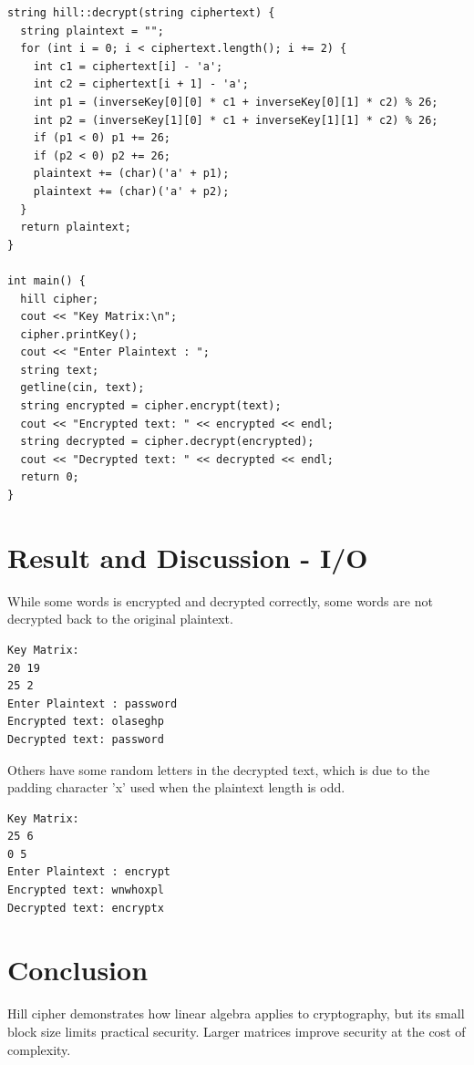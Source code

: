 \begin{verbatim}
string hill::decrypt(string ciphertext) {
  string plaintext = "";
  for (int i = 0; i < ciphertext.length(); i += 2) {
    int c1 = ciphertext[i] - 'a';
    int c2 = ciphertext[i + 1] - 'a';
    int p1 = (inverseKey[0][0] * c1 + inverseKey[0][1] * c2) % 26;
    int p2 = (inverseKey[1][0] * c1 + inverseKey[1][1] * c2) % 26;
    if (p1 < 0) p1 += 26;
    if (p2 < 0) p2 += 26;
    plaintext += (char)('a' + p1);
    plaintext += (char)('a' + p2);
  }
  return plaintext;
}

int main() {
  hill cipher;
  cout << "Key Matrix:\n";
  cipher.printKey();
  cout << "Enter Plaintext : ";
  string text;
  getline(cin, text);
  string encrypted = cipher.encrypt(text);
  cout << "Encrypted text: " << encrypted << endl;
  string decrypted = cipher.decrypt(encrypted);
  cout << "Decrypted text: " << decrypted << endl;
  return 0;
}
\end{verbatim}

\newpage

\section{Result and Discussion - I/O}
While some words is encrypted and decrypted correctly, some words are not decrypted back to the original plaintext.
\begin{verbatim}
Key Matrix:
20 19
25 2
Enter Plaintext : password
Encrypted text: olaseghp
Decrypted text: password
\end{verbatim}
Others have some random letters in the decrypted text, which is due to the padding character 'x' used when the plaintext length is odd.
\begin{verbatim}
Key Matrix:
25 6
0 5
Enter Plaintext : encrypt
Encrypted text: wnwhoxpl
Decrypted text: encryptx
\end{verbatim}


\section{Conclusion}
Hill cipher demonstrates how linear algebra applies to cryptography, but its small block size limits practical security. Larger matrices improve security at the cost of complexity.
